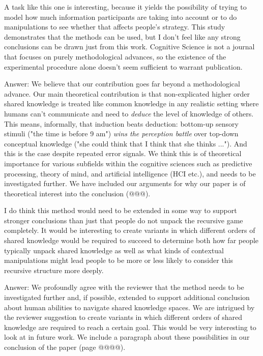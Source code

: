 \documentclass[a4paper]{article}
\newenvironment{robin}{\smallskip \noindent \color{red!10!green!50!blue}}{\color{black}\smallskip}
\begin{document}
A task like this one is interesting, because it yields the possibility of trying to model how much information participants are taking into account or to do manipulations to see whether that affects people's strategy. This study demonstrates that the methods can be used, but I don't feel like any strong conclusions can be drawn just from this work. Cognitive Science is not a journal that focuses on purely methodological advances, so the existence of the experimental procedure alone doesn't seem sufficient to warrant publication.

\begin{robin} Answer: We believe that our contribution goes far beyond a methodological advance. Our main theoretical contribution is that non-explicated higher order shared knowledge is treated like common knowledge in any realistic setting where humans can't communicate and need to \emph{deduce} the level of knowledge of others. This means, informally, that induction beats deduction: bottom-up sensory stimuli ("the time is before 9 am") \emph{wins the perception battle} over top-down conceptual knowledge ("she could think that I think that she thinks ..."). And this is the case despite repeated error signals. We think this is of theoretical importance for various subfields within the cognitive sciences such as predictive processing, theory of mind, and artificial intelligence (HCI etc.), and needs to be investigated further. We have included our arguments for why our paper is of theoretical interest into the conclusion (@@@).
\end{robin}

I do think this method would need to be extended in some way to support stronger conclusions than just that people do not unpack the recursive game completely. It would be interesting to create variants in which different orders of shared knowledge would be required to succeed to determine both how far people typically unpack shared knowledge as well as what kinds of contextual manipulations might lead people to be more or less likely to consider this recursive structure more deeply.

\begin{robin} Answer: We profoundly agree with the reviewer that the method needs to be investigated further and, if possible, extended to support additional conclusion about human abilities to navigate shared knowledge spaces. We are intrigued by the reviewer suggestion to create variants in which different orders of shared knowledge are required to reach a certain goal. This would be very interesting to look at in future work. We include a paragraph about these possibilities in our conclusion  of the paper (page @@@@).
\end{robin}
\end{document}

